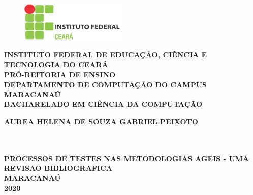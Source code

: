 \thispagestyle{empty}

\vfill
 \begin{center}
    \begin{figure}[t]
     \centering
            \includegraphics[width=5cm]{./figures/IF_logo.png}\\[-0.1in]
     \end{figure}

    {\large\bfseries INSTITUTO FEDERAL DE EDUCAÇÃO, CIÊNCIA E TECNOLOGIA DO CEARÁ} \\
    {\large\bfseries PRÓ-REITORIA DE ENSINO} \\
    {\large\bfseries DEPARTAMENTO DE COMPUTAÇÃO DO CAMPUS MARACANAÚ}  \\ 
    {\large\bfseries BACHARELADO EM CIÊNCIA DA COMPUTAÇÃO}  \\ 

    \vspace*{1in}
    \begin{large} \bfseries AUREA HELENA DE SOUZA GABRIEL PEIXOTO\end{large}\\[0.4in]

    \vspace*{4cm}
    \noindent \\
    \large\bfseries{PROCESSOS DE TESTES NAS METODOLOGIAS AGEIS - UMA REVISAO BIBLIOGRAFICA } \\
    \vfill
    \large\bfseries{ MARACANAÚ \\ 2020}
\end{center}

\normalsize
